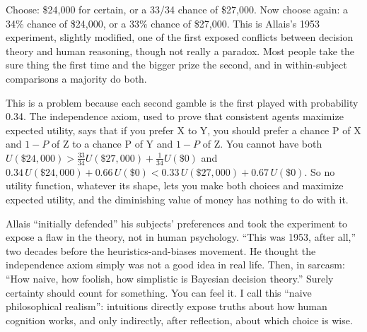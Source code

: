 
Choose: \$24,000 for certain, or a 33/34 chance of \$27,000. Now choose again: a 34\% chance of \$24,000, or a 33\% chance of \$27,000. This is Allais's 1953 experiment, slightly modified, one of the first exposed conflicts between decision theory and human reasoning, though not really a paradox. Most people take the sure thing the first time and the bigger prize the second, and in within-subject comparisons a majority do both. 

This is a problem because each second gamble is the first played with probability 0.34. The independence axiom, used to prove that consistent agents maximize expected utility, says that if you prefer X to Y, you should prefer a chance P of X and $1-P$ of Z to a chance P of Y and $1-P$ of Z. You cannot have both $U(\$24{,}000) > \frac{33}{34}U(\$27{,}000) + \frac{1}{34}U(\$0)$ and $0.34\,U(\$24{,}000) + 0.66\,U(\$0) < 0.33\,U(\$27{,}000) + 0.67\,U(\$0)$. So no utility function, whatever its shape, lets you make both choices and maximize expected utility, and the diminishing value of money has nothing to do with it. 

Allais ``initially defended'' his subjects' preferences and took the experiment to expose a flaw in the theory, not in human psychology. ``This was 1953, after all,'' two decades before the heuristics-and-biases movement. He thought the independence axiom simply was not a good idea in real life.  Then, in sarcasm: ``How naive, how foolish, how simplistic is Bayesian decision theory.'' Surely certainty should count for something. You can feel it. I call this ``naive philosophical realism'': intuitions directly expose truths about how human cognition works, and only indirectly, after reflection, about which choice is wise. 

